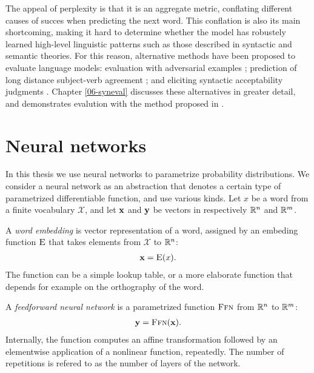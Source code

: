    The appeal of perplexity is that it is an aggregate metric, conflating different causes of succes when predicting the next word. This conflation is also its main shortcoming, making it hard to determine whether the model has robustely learned high-level linguistic patterns such as those described in syntactic and semantic theories. For this reason, alternative methods have been proposed to evaluate language models: evaluation with adversarial examples \citep{smith2012adversarial}; prediction of long distance subject-verb agreement \citep{linzen2016syntax}; and eliciting syntactic acceptability judgments \citep{linzen2018targeted}. Chapter \ref{06-syneval} discusses these alternatives in greater detail, and demonstrates evalution with the method proposed in \citep{linzen2018targeted}.


\section{Neural networks}

  In this thesis we use neural networks to parametrize probability distributions. We consider a neural network as an abstraction that denotes a certain type of parametrized differentiable function, and use various kinds. Let $x$ be a word from a finite vocabulary $\mathcal{X}$, and let $\mathbf{x}$ and $\mathbf{y}$ be vectors in respectively $\mathbb{R}^{n}$ and $\mathbb{R}^{m}$.

  \begin{definition}{} A \textit{word embedding} is vector representation of a word, assigned by an embeding function $\textsc{E}$ that takes elements from $\mathcal{X}$ to $\mathbb{R}^{n}$:
  \begin{align*}
    \mathbf{x} = \textsc{E}( x ).
  \end{align*}
  The function can be a simple lookup table, or a more elaborate function that depends for example on the orthography of the word.
  \end{definition}

  \begin{definition}{} A \textit{feedforward neural network} is a parametrized function $\textsc{Ffn}$ from $\mathbb{R}^{n}$ to $\mathbb{R}^{m}$:
  \begin{align*}
    \mathbf{y} = \textsc{Ffn}( \mathbf{x} ).
  \end{align*}
  Internally, the function computes an affine transformation followed by an elementwise application of a nonlinear function, repeatedly. The number of repetitions is refered to as the number of layers of the network.
  \end{definition}

